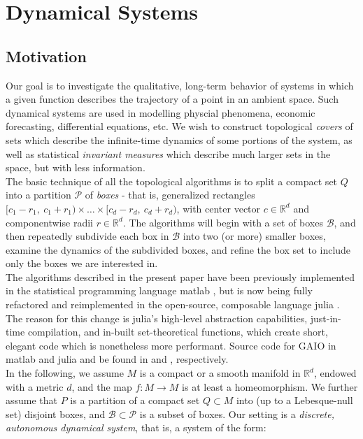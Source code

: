 \section{Dynamical Systems}


\subsection{Motivation}\label{sec:mot}

Our goal is to investigate the qualitative, long-term behavior of systems in which a given 
function describes the trajectory of a point in an ambient space. Such dynamical systems 
are used in modelling physcial phenomena, economic forecasting, differential equations, etc. 
We wish to construct topological \emph{covers} of sets which describe the infinite-time 
dynamics of some portions of the system, as well as statistical \emph{invariant measures} 
which describe much larger sets in the space, but with less information. \\

The basic technique of all the topological algorithms is to split a compact set $Q$ into 
a partition $\mathcal{P}$ of \emph{boxes} - that is, generalized rectangles
$[c_1 - r_1,\ c_1 + r_1) \times \ldots \times [c_d - r_d,\ c_d + r_d)$, with 
center vector $c \in \mathbb{R}^d$ and componentwise radii $r \in \mathbb{R}^d$. 
The algorithms will begin with a set of boxes 
$\mathcal{B}$, and then repeatedly subdivide each box in $\mathcal{B}$ into two (or more) 
smaller boxes, examine the dynamics of the subdivided boxes, and refine the box set to 
include only the boxes we are interested in. \\

The algorithms described in the present paper have been previously implemented in the 
statistical programming language matlab \cite*{matlab}, but is now being fully refactored and
reimplemented in the open-source, composable language julia \cite*{julia}. The reason for this 
change is julia's high-level abstraction capabilities, just-in-time compilation, and 
in-built set-theoretical functions, which create short, elegant code which is nonetheless 
more performant. Source code for GAIO in matlab and julia and be 
found in \cite*{oldGAIO} and \cite*{GAIO}, respectively. \\

In the following, we assume $M$ is a compact or a smooth manifold 
in $\mathbb{R}^d$, endowed with a metric $d$, and the 
map $f: M \to M$ is at least a homeomorphism. We further assume that $P$ is a partition 
of a compact set $Q \subset M$ into (up to a Lebesque-null set) disjoint boxes, and 
$\mathcal{B} \subset \mathcal{P}$ is a subset of boxes. Our setting is a 
\emph{discrete, autonomous dynamical system}, that is, a system of the form:

